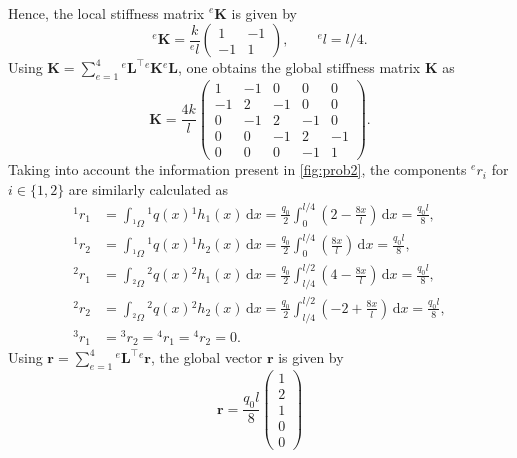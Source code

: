 \documentclass[a4paper,11pt]{article}
\numberwithin{equation}{section}
\newcommand\matr[1]{\ensuremath{\boldsymbol{\mathbf{#1}}}}
\newcommand\vect[1]{\ensuremath{\bm{#1}}}
\begin{document}
{\begin{align}
\end{align} Hence, the local stiffness matrix $^e \matr{K}$ is given by \begin{equation}
	^e \matr{K} = \frac{k}{^e l}\begin{pmatrix}
		1 & -1 \\
		-1 & 1
	\end{pmatrix}, \qquad ^e l = l/4.
\end{equation} Using $\matr{K} = \sum_{e=1}^{4}{}^e \matr{L}^\top {}^e \matr{K} {}^e\matr{L}$, one obtains the global stiffness matrix $\matr{K}$ as \begin{equation}
	\matr{K} = \frac{4k}{l}\begin{pmatrix}
		1 & -1 & 0 & 0 & 0 \\
		-1 & 2 & -1 & 0 & 0 \\
		0 & -1 & 2 & -1 & 0 \\
		0 & 0 & -1 & 2 & -1 \\
		0 & 0 & 0 & -1 & 1
	\end{pmatrix}.
\end{equation} Taking into account the information present in \cref{fig:prob2}, the components $^e r_i$ for $i \in\{1,2\}$ are similarly calculated as  
\begin{align}
	^1 r_1 &= \int_{{}^1\Omega} {}^1 q(x) {}^1 h_1(x)\,\mathrm{d}x = \frac{q_0}{2}\int_{0}^{l/4}\left(2-\frac{8x}{l}\right)\,\mathrm{d}x = \frac{q_0 l}{8}, \\
	^1 r_2 &= \int_{{}^1\Omega} {}^1 q(x) {}^1 h_2(x)\,\mathrm{d}x = \frac{q_0}{2}\int_{0}^{l/4}\left(\frac{8x}{l}\right)\,\mathrm{d}x = \frac{q_0 l}{8}, \\
	^2 r_1 &= \int_{{}^2\Omega} {}^2 q(x) {}^2 h_1(x)\,\mathrm{d}x = \frac{q_0}{2}\int_{l/4}^{l/2}\left(4-\frac{8x}{l}\right)\,\mathrm{d}x = \frac{q_0 l}{8}, \\
	^2 r_2 &= \int_{{}^2\Omega} {}^2 q(x) {}^2 h_2(x)\,\mathrm{d}x = \frac{q_0}{2}\int_{l/4}^{l/2}\left(-2+\frac{8x}{l}\right)\,\mathrm{d}x = \frac{q_0 l}{8}, \\
	^3 r_1 &= {}^3 r_2 = {}^4 r_1 = {}^4 r_2 = 0.
\end{align} Using $\vect{r} = \sum_{e=1}^{4} {}^e \matr{L}^\top {}^e\vect{r}$, the global vector $\vect{r}$ is given by \begin{equation}
	\vect{r} = \frac{q_0 l}{8}\begin{pmatrix}
		1 \\ 2 \\ 1 \\ 0  \\ 0

\end{pmatrix}
\end{equation}}
\end{document}
